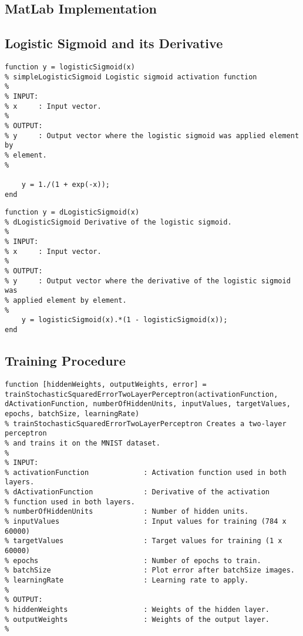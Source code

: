 \begin{appendices}

\section{MatLab Implementation}

\subsection{Logistic Sigmoid and its Derivative}
\begin{lstlisting}[label={lst:activation-function}]
function y = logisticSigmoid(x)
% simpleLogisticSigmoid Logistic sigmoid activation function
% 
% INPUT:
% x     : Input vector.
%
% OUTPUT:
% y     : Output vector where the logistic sigmoid was applied element by
% element.
%

    y = 1./(1 + exp(-x));
end
\end{lstlisting}

\begin{lstlisting}
function y = dLogisticSigmoid(x)
% dLogisticSigmoid Derivative of the logistic sigmoid.
% 
% INPUT:
% x     : Input vector.
%
% OUTPUT:
% y     : Output vector where the derivative of the logistic sigmoid was
% applied element by element.
%
    y = logisticSigmoid(x).*(1 - logisticSigmoid(x));
end
\end{lstlisting}

\subsection{Training Procedure}
\begin{lstlisting}[label={lst:train-two-layer-perceptron}]
function [hiddenWeights, outputWeights, error] = trainStochasticSquaredErrorTwoLayerPerceptron(activationFunction, dActivationFunction, numberOfHiddenUnits, inputValues, targetValues, epochs, batchSize, learningRate)
% trainStochasticSquaredErrorTwoLayerPerceptron Creates a two-layer perceptron
% and trains it on the MNIST dataset.
%
% INPUT:
% activationFunction             : Activation function used in both layers.
% dActivationFunction            : Derivative of the activation
% function used in both layers.
% numberOfHiddenUnits            : Number of hidden units.
% inputValues                    : Input values for training (784 x 60000)
% targetValues                   : Target values for training (1 x 60000)
% epochs                         : Number of epochs to train.
% batchSize                      : Plot error after batchSize images.
% learningRate                   : Learning rate to apply.
%
% OUTPUT:
% hiddenWeights                  : Weights of the hidden layer.
% outputWeights                  : Weights of the output layer.
% 


\end{lstlisting}
\end{appendices}
